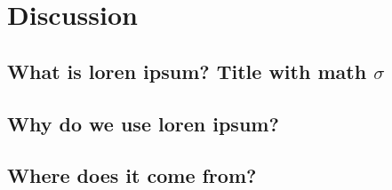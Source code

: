 
\chapter{Discussion}  %

\ifpdf
    \graphicspath{{Chapter6/Figs/Raster/}{Chapter6/Figs/PDF/}{Chapter6/Figs/}}
\else
    \graphicspath{{Chapter6/Figs/Vector/}{Chapter6/Figs/}}
\fi


\section{What is loren ipsum? Title with math \texorpdfstring{$\sigma$}{[sigma]}} %



\section{Why do we use loren ipsum?} %


\section{Where does it come from?}  %
\label{section6.3}

